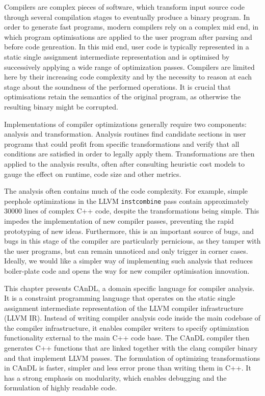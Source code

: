     Compilers are complex pieces of software, which transform input source code
    through several compilation stages to eventually produce a binary program.
    In order to generate fast programs, modern compilers rely on a complex mid
    end, in which program optimisations are applied to the user program after
    parsing and before code genreation.
    In this mid end, user code is typically represented in a static single
    assignment intermediate representation and is optimised by successively
    applying a wide range of optimization passes.
    Compilers are limited here by their increasing code complexity and by the
    necessity to reason at each stage about the soundness of the performed
    operations.
    It is crucial that optimisations retain the semantics of the original
    program, as otherwise the resulting binary might be corrupted.
    

    Implementations of compiler optimizations generally require two components:
    analysis and transformation.
    Analysis routines find candidate sections in user programs that could profit
    from specific transformations and verify that all conditions are satisfied
    in order to legally apply them.
    Transformations are then applied to the analysis results, often after
    consulting heuristic cost models to gauge the effect on runtime, code size
    and other metrics.

    The analysis often contains much of the code complexity.
    For example, simple peephole optimizations in the LLVM {\tt instcombine}
    pass contain approximately 30000 lines of complex C++ code, despite the
    transformations being simple.
    This impedes the implementation of new compiler passes, preventing the rapid
    prototyping of new ideas.
    Furthermore, this is an important source of bugs, and bugs in this stage of
    the compiler are particularly pernicious, as they tamper with the user
    programs, but can remain unnoticed and only trigger in corner cases.
    Ideally, we would like a simpler way of implementing such analysis that
    reduces boiler-plate code and opens the way for new compiler optimisation
    innovation.

    This chapter presents CAnDL, a domain specific language for compiler
    analysis.
    It is a constraint programming language that operates on the static single
    assignment intermediate representation of the LLVM compiler infrastructure
    (LLVM IR).
    Instead of writing compiler analysis code inside the main codebase of the
    compiler infrastructure, it enables compiler writers to specify optimization
    functionality external to the main C++ code base.
    The CAnDL compiler then generates C++ functions that are linked together
    with the clang compiler binary and that implement LLVM passes.
    The formulation of optimizing transformations in CAnDL is faster, simpler
    and less error prone than writing them in C++.
    It has a strong emphasis on modularity, which enables debugging and the
    formulation of highly readable code.

